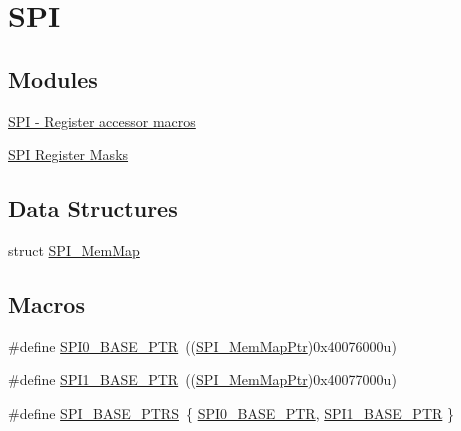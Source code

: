\hypertarget{group___s_p_i___peripheral}{}\section{S\+P\+I}
\label{group___s_p_i___peripheral}
\subsection*{Modules}
\begin{DoxyCompactItemize}
\item 
\hyperlink{group___s_p_i___register___accessor___macros}{S\+P\+I -\/ Register accessor macros}
\item 
\hyperlink{group___s_p_i___register___masks}{S\+P\+I Register Masks}
\end{DoxyCompactItemize}
\subsection*{Data Structures}
\begin{DoxyCompactItemize}
\item 
struct \hyperlink{struct_s_p_i___mem_map}{S\+P\+I\+\_\+\+Mem\+Map}
\end{DoxyCompactItemize}
\subsection*{Macros}
\begin{DoxyCompactItemize}
\item 
\#define \hyperlink{group___s_p_i___peripheral_ga851f64a97b5919c1f99a34db5918b3b4}{S\+P\+I0\+\_\+\+B\+A\+S\+E\+\_\+\+P\+T\+R}~((\hyperlink{group___s_p_i___peripheral_ga7e4e9921e4d56bdbb10a04e77743ff5e}{S\+P\+I\+\_\+\+Mem\+Map\+Ptr})0x40076000u)
\item 
\#define \hyperlink{group___s_p_i___peripheral_gae28fd789e0602a32076c1c13ca39f5af}{S\+P\+I1\+\_\+\+B\+A\+S\+E\+\_\+\+P\+T\+R}~((\hyperlink{group___s_p_i___peripheral_ga7e4e9921e4d56bdbb10a04e77743ff5e}{S\+P\+I\+\_\+\+Mem\+Map\+Ptr})0x40077000u)
\item 
\#define \hyperlink{group___s_p_i___peripheral_ga3a16fecfe27c2052ab60e014be3f66f6}{S\+P\+I\+\_\+\+B\+A\+S\+E\+\_\+\+P\+T\+R\+S}~\{ \hyperlink{group___s_p_i___peripheral_ga851f64a97b5919c1f99a34db5918b3b4}{S\+P\+I0\+\_\+\+B\+A\+S\+E\+\_\+\+P\+T\+R}, \hyperlink{group___s_p_i___peripheral_gae28fd789e0602a32076c1c13ca39f5af}{S\+P\+I1\+\_\+\+B\+A\+S\+E\+\_\+\+P\+T\+R} \}
\end{DoxyCompactItemize}
